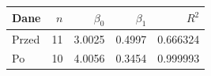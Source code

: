 \begin{tabular}{lrrrr}
\toprule
Dane & $n$ & $\beta_0$ & $\beta_1$ & $R^2$ \\
\midrule
Przed & 11 & \num{3.0025} & \num{0.4997} & \num{0.666324} \\
Po & 10 & \num{4.0056} & \num{0.3454} & \num{0.999993} \\
\bottomrule
\end{tabular}
